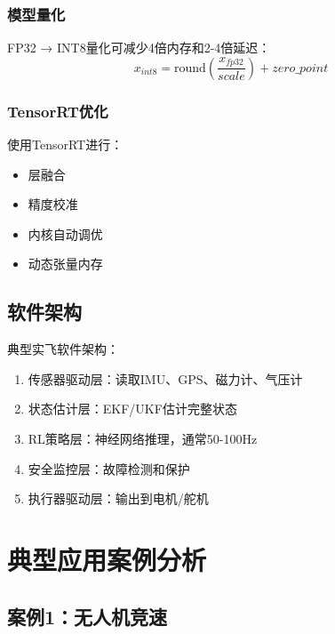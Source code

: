 \documentclass[12pt,a4paper]{ctexart}
\begin{document}
\subsubsection{模型量化}

FP32 → INT8量化可减少4倍内存和2-4倍延迟：
\begin{equation}
x_{int8} = \text{round}\left(\frac{x_{fp32}}{scale}\right) + zero\_point
\end{equation}

\subsubsection{TensorRT优化}

使用TensorRT进行：
\begin{itemize}
    \item 层融合
    \item 精度校准
    \item 内核自动调优
    \item 动态张量内存
\end{itemize}

\subsection{软件架构}

典型实飞软件架构：
\begin{enumerate}
    \item 传感器驱动层：读取IMU、GPS、磁力计、气压计
    \item 状态估计层：EKF/UKF估计完整状态
    \item RL策略层：神经网络推理，通常50-100Hz
    \item 安全监控层：故障检测和保护
    \item 执行器驱动层：输出到电机/舵机
\end{enumerate}

\section{典型应用案例分析}\label{sec:case_studies}

\subsection{案例1：无人机竞速}
\end{document}
